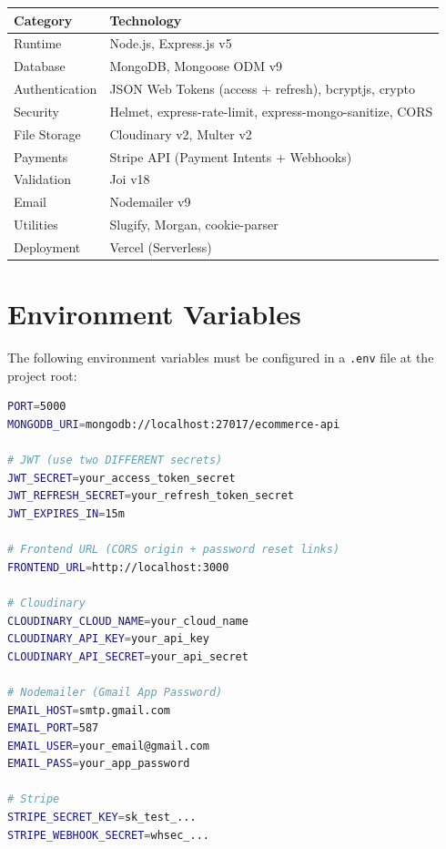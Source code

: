 \begin{longtable}{@{}ll@{}}
  \toprule
  \textbf{Category} & \textbf{Technology} \\
  \midrule
  Runtime           & Node.js, Express.js v5 \\
  Database          & MongoDB, Mongoose ODM v9 \\
  Authentication    & JSON Web Tokens (access + refresh), bcryptjs, crypto \\
  Security          & Helmet, express-rate-limit, express-mongo-sanitize, CORS \\
  File Storage      & Cloudinary v2, Multer v2 \\
  Payments          & Stripe API (Payment Intents + Webhooks) \\
  Validation        & Joi v18 \\
  Email             & Nodemailer v9 \\
  Utilities         & Slugify, Morgan, cookie-parser \\
  Deployment        & Vercel (Serverless) \\
  \bottomrule
\end{longtable}

\section{Environment Variables}

The following environment variables must be configured in a \texttt{.env} file at the project root:

\begin{lstlisting}[language=bash,title=.env]
PORT=5000
MONGODB_URI=mongodb://localhost:27017/ecommerce-api

# JWT (use two DIFFERENT secrets)
JWT_SECRET=your_access_token_secret
JWT_REFRESH_SECRET=your_refresh_token_secret
JWT_EXPIRES_IN=15m

# Frontend URL (CORS origin + password reset links)
FRONTEND_URL=http://localhost:3000

# Cloudinary
CLOUDINARY_CLOUD_NAME=your_cloud_name
CLOUDINARY_API_KEY=your_api_key
CLOUDINARY_API_SECRET=your_api_secret

# Nodemailer (Gmail App Password)
EMAIL_HOST=smtp.gmail.com
EMAIL_PORT=587
EMAIL_USER=your_email@gmail.com
EMAIL_PASS=your_app_password

# Stripe
STRIPE_SECRET_KEY=sk_test_...
STRIPE_WEBHOOK_SECRET=whsec_...
\end{lstlisting}
